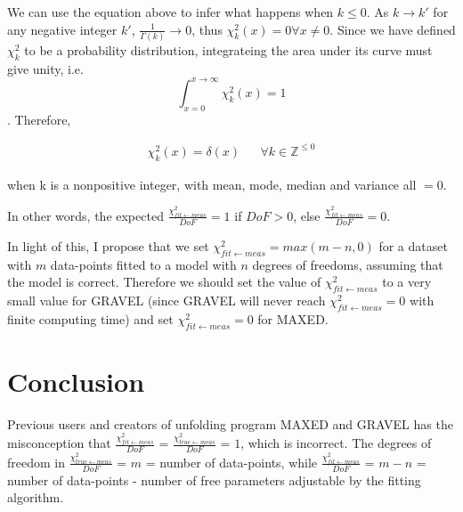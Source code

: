 \documentclass[a4paper, 12pt]{article}
\newcommand{\chifit}{\frac{\chi^2_{fit\leftarrow meas}}{DoF} }
\newcommand{\chitrue}{\frac{\chi^2_{true\leftarrow meas}}{DoF}}
\begin{document}
We can use the equation above to infer what happens when $k\leq0$. As $k\rightarrow k'$ for any negative integer $k'$, $\frac{1}{\Gamma(k)}\rightarrow0$, thus $\chi^2_k(x)=0 \forall x\neq0$. Since we have defined $\chi^2_k$ to be a probability distribution, integrateing the area under its curve must give unity, i.e.$$\int_{x=0}^{x\rightarrow\infty}\chi^2_k(x)=1$$. Therefore, 

\begin{align}    
\chi^2_k(x)=\delta(x) & & \forall k \in\mathbb{Z}^{\leq0}
\end{align}

when k is a nonpositive integer, with mean, mode, median and variance all $=0$.

In other words, the expected $\chifit=1$ if $DoF>0$, else $\chifit=0$.


In light of this, I propose that we set $\chi^2_{fit\leftarrow meas}=max(m-n,0)$ for a dataset with $m$ data-points fitted to a model with $n$ degrees of freedoms, assuming that the model is correct.
Therefore we should set the value of $\chi^2_{fit\leftarrow meas}$ to a very small value for GRAVEL (since GRAVEL will never reach $\chi^2_{fit\leftarrow meas}=0$ with finite computing time) and set $\chi^2_{fit\leftarrow meas}=0$ for MAXED.


% 
% 
\section{Conclusion}
Previous users and creators of unfolding program MAXED and GRAVEL has the misconception that $\chifit$ = $\chitrue$ = $1$, which is incorrect. The degrees of freedom in $\chitrue$ = $m$ = number of data-points, while $\chifit$ = $m-n$ = number of data-points - number of free parameters adjustable by the fitting algorithm.
\end{document}
